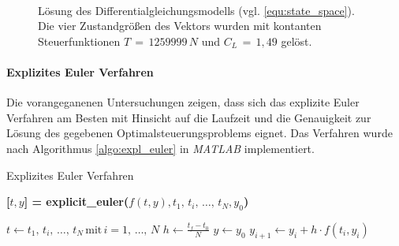 \begin{figure}[!htbp]
    \centering 
    \qquad
     \\

    \qquad
    \caption{Lösung des Differentialgleichungsmodells (vgl. \eqref{equ:state_space}). Die vier Zustandgrößen des Vektors wurden mit kontanten Steuerfunktionen \(T\,=\,1259999\,N\) und \(C_L\,=\,1,49\) gelöst.} %
\end{figure}


\paragraph{Explizites Euler Verfahren}
Die vorangeganenen Untersuchungen zeigen, dass sich das explizite Euler Verfahren am Besten mit Hinsicht auf die Laufzeit und die Genauigkeit zur Lösung des gegebenen Optimalsteuerungsproblems eignet. Das Verfahren wurde nach Algorithmus \ref{algo:expl_euler} in \textit{MATLAB} implementiert.

\begin{algorithm}[H]
    \caption{Explizites Euler Verfahren}\label{algo:expl_euler}
    \textbf{[$t, y $] = explicit\_euler($ f(t, y), {t_1,\,t_i,\,\dots,\,t_N}, y_0$)}
    \begin{algorithmic}
        \vspace{.2em}
        \STATE $t \leftarrow {t_1,\,t_i,\,\dots,\,t_N}\,\text{mit}\,i = 1,\,\dots,\,N$
        \vspace{.2em}
        \STATE $h \leftarrow \frac{t_f-t_0}{N}$
        \vspace{.2em}
        \STATE $y \leftarrow y_0$
        \vspace{.2em}
            \STATE $y_{i+1} \leftarrow y_i + h \cdot f(t_i, y_i) $
        \ENDFOR
        \vspace{.8em}
    \end{algorithmic}
\end{algorithm}


